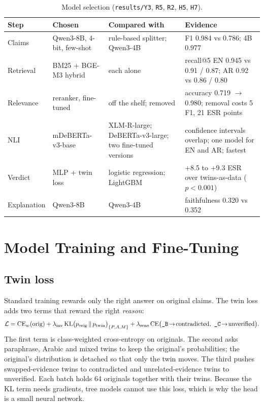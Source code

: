 \begin{table}[t]
\centering\small
\caption{Model selection (\texttt{results/Y3}, \texttt{R5}, \texttt{R2}, \texttt{H5}, \texttt{H7}).}
\label{tab:choices}
\begin{tabularx}{\textwidth}{@{}l l X X@{}}
\toprule
Step & Chosen & Compared with & Evidence \\
\midrule
Claims & Qwen3-8B, 4-bit, few-shot & rule-based splitter; Qwen3-4B & F1 0.984 vs 0.786; 4B 0.977 \\
Retrieval & BM25 + BGE-M3 hybrid & each alone & recall@5 EN 0.945 vs 0.91 / 0.87; AR 0.92 vs 0.86 / 0.80 \\
Relevance & reranker, fine-tuned & off the shelf; removed & accuracy 0.719 $\rightarrow$ 0.980; removal costs 5 F1, 21 ESR points \\
NLI & mDeBERTa-v3-base & XLM-R-large; DeBERTa-v3-large; two fine-tuned versions & confidence intervals overlap; one model for EN and AR; fastest \\
Verdict & MLP + twin loss & logistic regression; LightGBM & +8.5 to +9.3 ESR over twins-as-data ($p<0.001$) \\
Explanation & Qwen3-8B & Qwen3-4B & faithfulness 0.320 vs 0.352 \\
\bottomrule
\end{tabularx}
\end{table}

\section{Model Training and Fine-Tuning}

\subsection{Twin loss}
Standard training rewards only the right answer on original claims. The twin loss adds two terms that reward the right \emph{reason}:
\begin{equation}
\mathcal{L} = \mathrm{CE}_w(\text{orig}) + \lambda_{\text{inv}}\,\mathrm{KL}\big(p_{\text{orig}} \,\|\, p_{\text{twin}}\big)_{\{P,A,M\}} + \lambda_{\text{sens}}\,\mathrm{CE}\big(\text{\tw{B}}\!\rightarrow\!\text{contradicted},\ \text{\tw{C}}\!\rightarrow\!\text{unverified}\big).
\end{equation}
The first term is class-weighted cross-entropy on originals. The second asks paraphrase, Arabic and mixed twins to keep the original's probabilities; the original's distribution is detached so that only the twin moves. The third pushes swapped-evidence twins to contradicted and unrelated-evidence twins to unverified. Each batch holds 64 originals together with their twins. Because the KL term needs gradients, tree models cannot use this loss, which is why the head is a small neural network.

